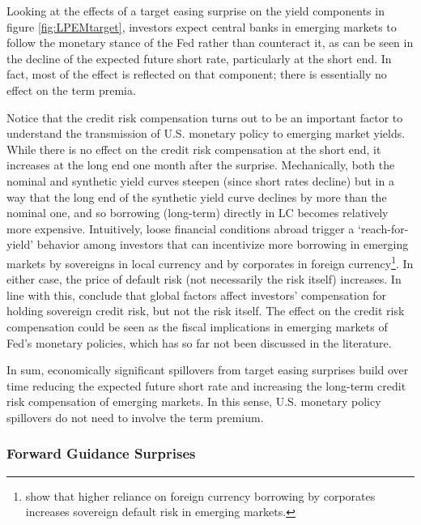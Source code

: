 {

Looking at the effects of a target easing surprise on the yield components in figure \ref{fig:LPEMtarget}, investors expect central banks in emerging markets to follow the monetary stance of the Fed rather than counteract it, as can be seen in the decline of the expected future short rate, particularly at the short end. In fact, most of the effect is reflected on that component; there is essentially no effect on the term premia. 

Notice that the credit risk compensation turns out to be an important factor to understand the transmission of U.S. monetary policy to emerging market yields. 
While there is no effect on the credit risk compensation at the short end, it increases at the long end one month after the surprise. 
Mechanically, both the nominal and synthetic yield curves steepen (since short rates decline) 
but in a way that the long end of the synthetic yield curve declines by more than the nominal one, 
and so borrowing (long-term) directly in LC becomes relatively more expensive. 
Intuitively, loose financial conditions abroad trigger a `reach-for-yield' behavior among investors \citep{HausmanWongswan:2011} that can incentivize more borrowing in emerging markets by sovereigns in local currency \citep{BigioNunoPassadore:2018} and by corporates in foreign currency\footnote{\cite{DuSchreger:2017WP} show that higher reliance on foreign currency borrowing by corporates increases sovereign default risk in emerging markets.}. 
In either case, the price of default risk (not necessarily the risk itself) increases. In line with this, \cite{JeanneretSouissi:2016} conclude that global factors affect investors’ compensation for holding sovereign credit risk, but not the risk itself. 
The effect on the credit risk compensation could be seen as the fiscal implications in emerging markets of Fed's monetary policies, which has so far not been discussed in the literature. 

In sum, economically significant spillovers from target easing surprises build over time reducing the expected future short rate and increasing the long-term credit risk compensation of emerging markets. In this sense, U.S. monetary policy spillovers do not need to involve the term premium.


\subsubsection{Forward Guidance Surprises}
\iftoggle{toclinks}{\gototoc}{} %

}
